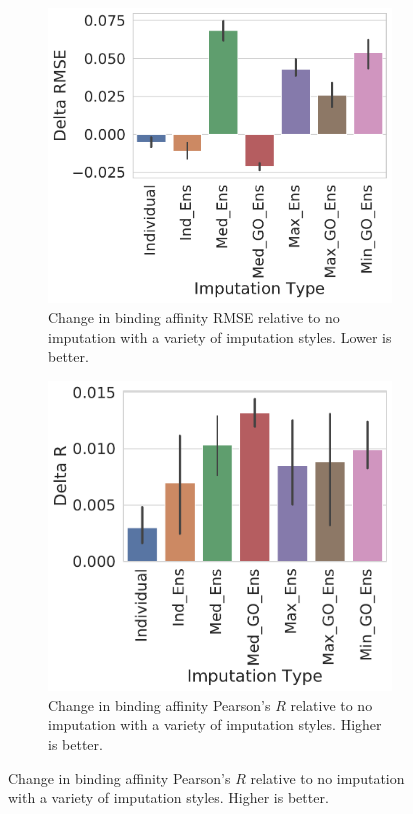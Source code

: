 \documentclass[journal=jcim,manuscript=article]{achemso}
\begin{document}
\begin{figure}[tbph]
    \centering
    \begin{subfigure}[t]{0.48\textwidth}
        \centering
        \includegraphics[width=\linewidth]{figures/ComparingImpStylesRMSE.pdf}
        \caption{Change in binding affinity RMSE relative to no imputation with a variety of imputation styles. Lower is better.}
    \end{subfigure}
    \hfill
    \begin{subfigure}[t]{0.48\textwidth}
        \centering
        \includegraphics[width=\linewidth]{figures/ComparingImpStylesR.pdf}
        \caption{Change in binding affinity Pearson's $R$ relative to no imputation with a variety of imputation styles. Higher is better.}
    \end{subfigure}


\end{figure}
\end{document}
